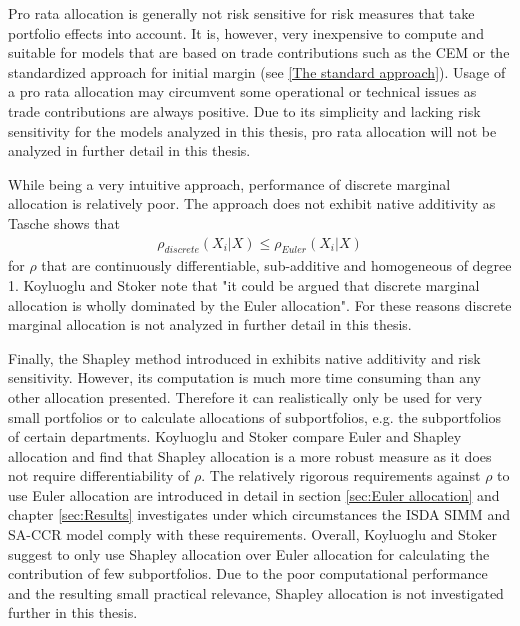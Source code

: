 \documentclass[../Thesis_AHoecherl.tex]{subfiles}
\begin{document}
Pro rata allocation is generally not risk sensitive for risk measures that take portfolio effects into account.
It is, however, very inexpensive to compute and suitable for models that are based on trade contributions such as the \gls{CEM} or the standardized approach for initial margin (see \ref{The standard approach}).
Usage of a pro rata allocation may circumvent some operational or technical issues as trade contributions are always positive.
Due to its simplicity and lacking risk sensitivity for the models analyzed in this thesis, pro rata allocation will not be analyzed in further detail in this thesis.

While being a very intuitive approach, performance of discrete marginal allocation is relatively poor. The approach does not exhibit native additivity as Tasche \cite{tasche2007} shows that 
\begin{align*}
    \rho_{discrete}\left(X_i|X\right) \leq \rho_{Euler}\left(X_i|X\right)
\end{align*}
for $\rho$ that are continuously differentiable, sub-additive and homogeneous of degree 1. 
Koyluoglu and Stoker \cite{koyluoglu2002risk} note that "it could be argued that discrete marginal allocation is wholly dominated by the Euler allocation". For these reasons discrete marginal allocation is not analyzed in further detail in this thesis.

Finally, the Shapley method introduced in \cite{shapley1951} exhibits native additivity and risk sensitivity.
However, its computation is much more time consuming than any other allocation presented. 
Therefore it can realistically only be used for very small portfolios or to calculate allocations of subportfolios, e.g. the subportfolios of certain departments.
Koyluoglu and Stoker \cite{koyluoglu2002risk} compare Euler and Shapley allocation and find that Shapley allocation is a more robust measure as it does not require differentiability of $\rho$. The relatively rigorous requirements against $\rho$ to use Euler allocation are introduced in detail in section \ref{sec:Euler allocation} and chapter \ref{sec:Results} investigates under which circumstances the \gls{ISDA SIMM} and \gls{SA-CCR} model comply with these requirements.
Overall, Koyluoglu and Stoker suggest to only use Shapley allocation over Euler allocation for calculating the contribution of few subportfolios.
Due to the poor computational performance and the resulting small practical relevance, Shapley allocation is not investigated further in this thesis.
\end{document}
